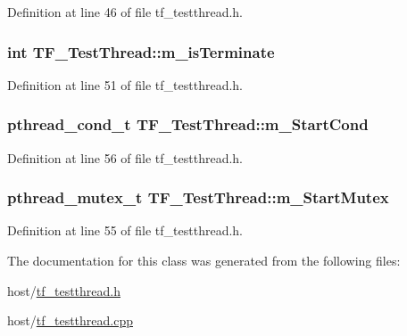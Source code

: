 Definition at line 46 of file tf\_\-testthread.h.\hypertarget{classTF__TestThread_ab7e24e3d4b9d6beb4a49d8845f5b2d9f}{
\subsubsection[{m\_\-isTerminate}]{\setlength{\rightskip}{0pt plus 5cm}int {\bf TF\_\-TestThread::m\_\-isTerminate}}}
\label{classTF__TestThread_ab7e24e3d4b9d6beb4a49d8845f5b2d9f}


Definition at line 51 of file tf\_\-testthread.h.\hypertarget{classTF__TestThread_a45462e11e298f01d4868e084aa67be1c}{
\subsubsection[{m\_\-StartCond}]{\setlength{\rightskip}{0pt plus 5cm}pthread\_\-cond\_\-t {\bf TF\_\-TestThread::m\_\-StartCond}}}
\label{classTF__TestThread_a45462e11e298f01d4868e084aa67be1c}


Definition at line 56 of file tf\_\-testthread.h.\hypertarget{classTF__TestThread_a1ad6411cf734262c0d8e58a763c88cfb}{
\subsubsection[{m\_\-StartMutex}]{\setlength{\rightskip}{0pt plus 5cm}pthread\_\-mutex\_\-t {\bf TF\_\-TestThread::m\_\-StartMutex}}}
\label{classTF__TestThread_a1ad6411cf734262c0d8e58a763c88cfb}


Definition at line 55 of file tf\_\-testthread.h.

The documentation for this class was generated from the following files:\begin{DoxyCompactItemize}
\item 
host/\hyperlink{tf__testthread_8h}{tf\_\-testthread.h}\item 
host/\hyperlink{tf__testthread_8cpp}{tf\_\-testthread.cpp}\end{DoxyCompactItemize}
